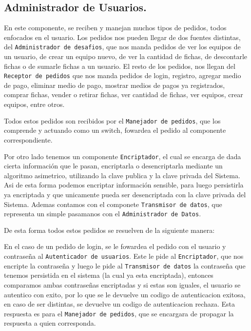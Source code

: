 \subsection{Administrador de Usuarios.}

%

En este componente, se reciben y manejan muchos tipos de pedidos, todos enfocados en el usuario. Los pedidos nos pueden llegar de dos fuentes distintas, del \texttt{Administrador de desafios}, que nos manda pedidos de ver los equipos de un usuario, de crear un equipo nuevo, de ver la cantidad de fichas, de descontarle fichas o de sumarle fichas a un usuario. El resto de los pedidos, nos llegan del \texttt{Receptor de pedidos} que nos manda pedidos de login, registro, agregar medio de pago, eliminar medio de pago, mostrar medios de pagos ya registrados, comprar fichas, vender o retirar fichas, ver cantidad de fichas, ver equipos, crear equipos, entre otros.

Todos estos pedidos son recibidos por el \texttt{Manejador de pedidos}, que los comprende y actuando como un switch, fowardea el pedido al componente correspondiente.

Por otro lado tenemos un componente \texttt{Encriptador}, el cual se encarga de dada cierta información que le pasan, encriptarla o desencriptarla mediante un algoritmo asimetrico, utilizando la clave publica y la clave privada del Sistema. Asi de esta forma podemos encriptar información sensible, para luego persistirla ya encriptada y que unicamente pueda ser desencriptada con la clave privada del Sistema. Ademas contamos con el componete \texttt{Transmisor de datos}, que representa un simple pasamanos con el \texttt{Administrador de Datos}.

De esta forma todos estos pedidos se resuelven de la siguiente manera:

En el caso de un pedido de login, se le fowardea el pedido con el usuario y contraseña al \texttt{Autenticador de usuarios}. Este le pide al \texttt{Encriptador}, que nos encripte la contraseña y luego le pide al \texttt{Transmisor de datos} la contraseña que tenemos persistida en el sistema (la cual ya esta encriptada), entonces comparamos ambas contraseñas encriptadas y si estas son iguales, el usuario se autentico con exito, por lo que se le devuelve un codigo de autenticacion exitosa, en caso de ser distintas, se devuelve un codigo de autenticacion rechaza. Esta respuesta es para el \texttt{Manejador de pedidos}, que se encargara de propagar la respuesta a quien corresponda.

